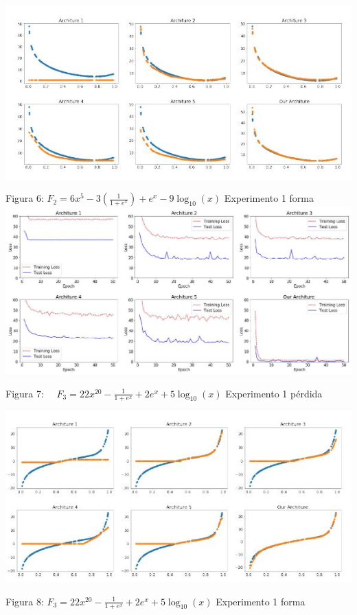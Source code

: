 \documentclass[10pt]{article}
\begin{document}
\includegraphics[max width=\textwidth]{2022_09_28_0067ec14010042dbf918g-09(1)}

Figura 6: $F_{2}=6 x^{5}-3\left(\frac{1}{1+e^{x}}\right)+e^{x}-9 \log _{10}(x)$ Experimento 1 forma\\

\includegraphics[max width=\textwidth]{2022_09_28_0067ec14010042dbf918g-10}

Figura 7: $\quad F_{3}=22 x^{20}-\frac{1}{1+e^{x}}+2 e^{x}+5 \log _{10}(x)$ Experimento 1 pérdida

\includegraphics[max width=\textwidth]{2022_09_28_0067ec14010042dbf918g-10(1)}

Figura 8: $F_{3}=22 x^{20}-\frac{1}{1+e^{x}}+2 e^{x}+5 \log _{10}(x)$ Experimento 1 forma\\
\end{document}
